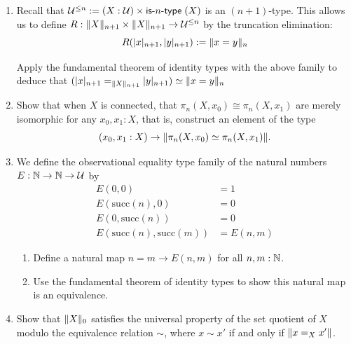 \documentclass[10pt,oneside,leqno,openright]{memoir}
\begin{document}
\begin{enumerate}
    Let $R : X \to X \to \UU$ be a reflexive binary relation. The following are equivalent   \begin{enumerate}
        \item The obvious map\footnote{i.e.\ the map defined by path induction which
          sends $\refl_x$ to the term of type $R(x,x)$ given to us by
          reflexivity of $R$} $x =_A y \to R(x,y)$  is an equivalence.
        \item For any $x :X$, the total space $(y : X) \times (R(x ,y))$ is contractible.
    \end{enumerate}
 \item Recall that $\mathcal{U}^{\le n} := (X: \mathcal{U}) \times \textsf{is-{$n$}-type}\;(X)$ is an $(n+1)$-type. This allows us to define $R : \lVert X\rVert_{n+1} \times \lVert X\rVert_{n+1} \to \mathcal{U}^{\le n}$ by the truncation elimination: 
    \[R(\lvert x\rvert_{n+1} , \lvert y\rvert_{n+1}) := \lVert x = y\rVert_{n}\]

    Apply the fundamental theorem of identity types with the above
    family to deduce that $(\lvert x\rvert_{n+1} =_{\lVert X\rVert_{n+1}} \lvert y\rvert_{n+1}) \simeq \lVert x = y\rVert_n$
    
  \item Show that when $X$ is connected, that $\pi_n(X, x_0) \cong \pi_n(X, x_1)$ are merely isomorphic for any $x_0, x_1 : X$, that is, construct an element of the type
    \[
      (x_0, x_1: X) \to \lVert\pi_n(X,x_0) \simeq \pi_n(X,x_1)\rVert.
    \]

    \item We define the observational equality type family of the natural numbers $E : \mathbb{N} \to \mathbb{N} \to \mathcal{U}$  by
        \begin{align*}
            E(0,0) &= 1 \\
            E(\mathrm{succ}(n), 0) &= 0 \\
            E(0, \mathrm{succ}(n)) &= 0 \\
            E(\mathrm{succ}(n), \mathrm{succ}(m)) &= E(n,m)
        \end{align*}
        \begin{enumerate}
            \item Define a natural map $n = m \to E(n,m)$ for all $n, m : \mathbb{N}$.
            \item Use the fundamental theorem of identity types to show this natural map is an equivalence.
        \end{enumerate}


  \item Show that $\lVert X\rVert_0$ satisfies the universal property of the set
    quotient of $X$ modulo the equivalence relation $\sim$, where $x\sim x'$ if
    and only if $\lVert x=_X x'\rVert$.
\end{enumerate}
\end{document}
